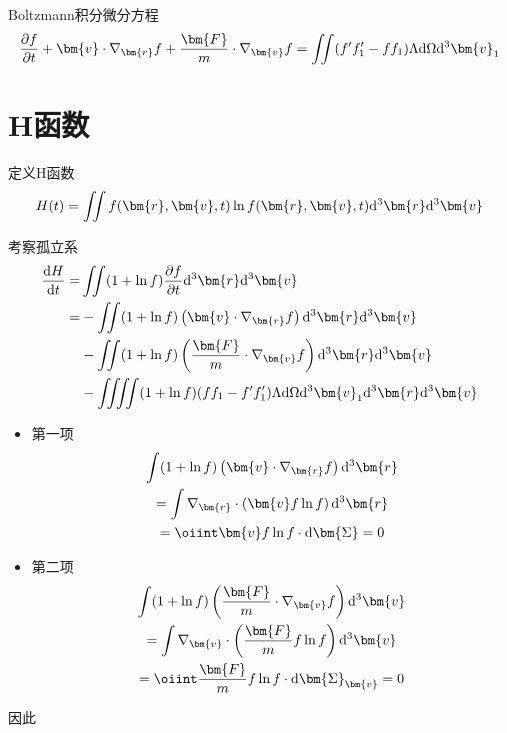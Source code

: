 Boltzmann积分微分方程
\begin{gather*}
    \pt{f}{t} + \bm{v} \cdot \nabla_{\bm{r}} f + \frac{\bm{F}}{m} \cdot \nabla_{\bm{v}} f = \iint (f' f_1' - f f_1) \Lambda \d \Omega \d^3 \bm{v}_1
\end{gather*}

\section{H函数}

定义H函数
\begin{gather*}
    H(t) = \iint f(\bm{r}, \bm{v}, t) \ln f(\bm{r}, \bm{v}, t) \d^3 \bm{r} \d^3 \bm{v}
\end{gather*}

考察孤立系
\begin{align*}
    \dt{H}{t} =& \iint (1 + \ln f) \pt{f}{t} \d^3 \bm{r} \d^3 \bm{v}
    \\
    =& - \iint (1+ \ln f) \left(\bm{v} \cdot \nabla_{\bm{r}} f\right) \d^3 \bm{r} \d^3 \bm{v} 
    \\
    &- \iint (1 + \ln f) \left(\frac{\bm{F}}{m} \cdot \nabla_{\bm{v}} f\right) \d^3 \bm{r} \d^3 \bm{v}
    \\
    &- \iiiint (1 + \ln f) (f f_1 - f' f'_1) \Lambda \d \Omega \d^3 \bm{v}_1 \d^3 \bm{r} \d^3 \bm{v}
\end{align*}
\begin{itemize}
    \item 第一项
    \begin{gather*}
        \int (1+ \ln f) \left(\bm{v} \cdot \nabla_{\bm{r}} f\right) \d^3 \bm{r}
        \\
        = \int \nabla_{\bm{r}} \cdot \left(\bm{v}f \ln f\right) \d^3 \bm{r}
        \\
        = \oiint \bm{v} f \ln f \cdot \d \bm{\Sigma} = 0
    \end{gather*}
    \item 第二项
    \begin{gather*}
        \int (1 + \ln f) \left(\frac{\bm{F}}{m} \cdot \nabla_{\bm{v}} f\right) \d^3 \bm{v}
        \\
        = \int \nabla_{\bm{v}} \cdot \left(\frac{\bm{F}}{m} f \ln f\right) \d^3 \bm{v}
        \\
        = \oiint \frac{\bm{F}}{m} f \ln f \cdot \d \bm{\Sigma}_{\bm{v}} = 0
    \end{gather*}
\end{itemize}
因此
